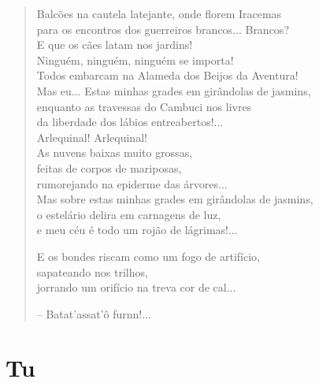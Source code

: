 \begin{verse}
Balcões na cautela latejante, onde florem Iracemas\\
para os encontros dos guerreiros brancos... Brancos?\\
E que os cães latam nos jardins!\\
Ninguém, ninguém, ninguém se importa!\\
Todos embarcam na Alameda dos Beijos da Aventura!\\
Mas eu... Estas minhas grades em girândolas de jasmins,\\
enquanto as travessas do Cambuci nos livres\\
da liberdade dos lábios entreabertos!...\\
Arlequinal! Arlequinal!\\
As nuvens baixas muito grossas,\\
feitas de corpos de mariposas,\\
rumorejando na epiderme das árvores...\\
Mas sobre estas minhas grades em girândolas de jasmins,\\
o estelário delira em carnagens de luz,\\
e meu céu é todo um rojão de lágrimas!...

E os bondes riscam como um fogo de artifício,\\
sapateando nos trilhos,\\
jorrando um orifício na treva cor de cal...

-- Batat'assat'ô furnn!...
\end{verse}

\chapter{Tu}

